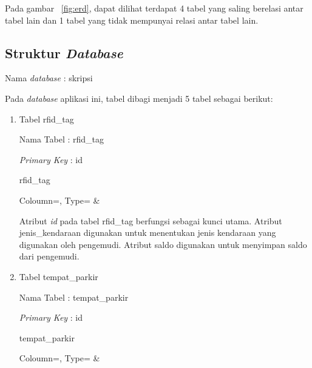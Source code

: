 Pada gambar ~\ref{fig:erd}, dapat dilihat terdapat 4 tabel yang saling berelasi antar tabel lain dan 1 tabel yang tidak mempunyai relasi antar tabel lain.

\subsection{Struktur \textit{Database}}
Nama \textit{database} : skripsi

Pada \textit{database} aplikasi ini, tabel dibagi menjadi 5 tabel sebagai berikut:

\begin{enumerate}[topsep=0pt,itemsep=0pt,partopsep=0pt, parsep=0pt]
    \item Tabel rfid\_tag

    Nama Tabel : rfid\_tag

    \textit{Primary Key} : id

    \begin{atable}
        \caption{rfid\_tag}
        \label{table:db_rfid_tag}
            {
                Coloumn=\Coloumn, 
                Type=\Type}
            {
                \Coloumn & 
                \Type}
    \end{atable}

    Atribut \textit{id} pada tabel rfid\_tag berfungsi sebagai kunci utama. Atribut jenis\_kendaraan digunakan untuk menentukan jenis kendaraan yang digunakan oleh pengemudi. Atribut saldo digunakan untuk menyimpan saldo dari pengemudi.

    \item Tabel tempat\_parkir

    Nama Tabel : tempat\_parkir

    \textit{Primary Key} : id

    \begin{table} [H]
        \centering
        \caption{tempat\_parkir}
        \label{table:db_tempat_parkir}
            {
                Coloumn=\Coloumn, 
                Type=\Type}
            {
                \Coloumn & 
                \Type}
    \end{table}


\end{enumerate}
